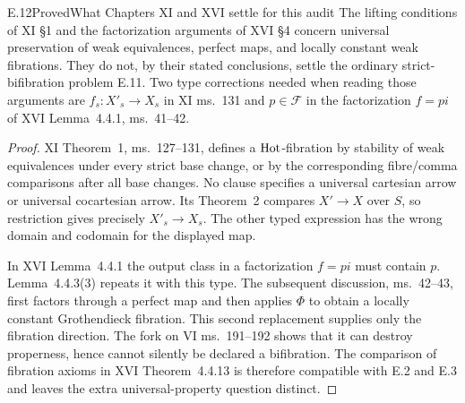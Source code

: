 \begin{statement}{E.12}{Proved}{What Chapters XI and XVI settle for this audit}
The lifting conditions of XI \S1 and the factorization arguments of XVI \S4 concern universal preservation of weak equivalences, perfect maps, and locally constant weak fibrations. They do not, by their stated conclusions, settle the ordinary strict-bifibration problem E.11. Two type corrections needed when reading those arguments are $f_s:X'_s\to X_s$ in XI ms.~131 and $p\in\mathcal F$ in the factorization $f=pi$ of XVI Lemma~4.4.1, ms.~41--42.
\end{statement}
\begin{proof}
XI Theorem~1, ms.~127--131, defines a $\mathrm{Hot}$-fibration by stability of weak equivalences under every strict base change, or by the corresponding fibre/comma comparisons after all base changes. No clause specifies a universal cartesian arrow or universal cocartesian arrow. Its Theorem~2 compares $X'\to X$ over $S$, so restriction gives precisely $X'_s\to X_s$. The other typed expression has the wrong domain and codomain for the displayed map.

In XVI Lemma~4.4.1 the output class in a factorization $f=pi$ must contain $p$. Lemma~4.4.3(3) repeats it with this type. The subsequent discussion, ms.~42--43, first factors through a perfect map and then applies $\Phi$ to obtain a locally constant Grothendieck fibration. This second replacement supplies only the fibration direction. The fork on VI ms.~191--192 shows that it can destroy properness, hence cannot silently be declared a bifibration. The comparison of fibration axioms in XVI Theorem~4.4.13 is therefore compatible with E.2 and E.3 and leaves the extra universal-property question distinct.
\end{proof}
